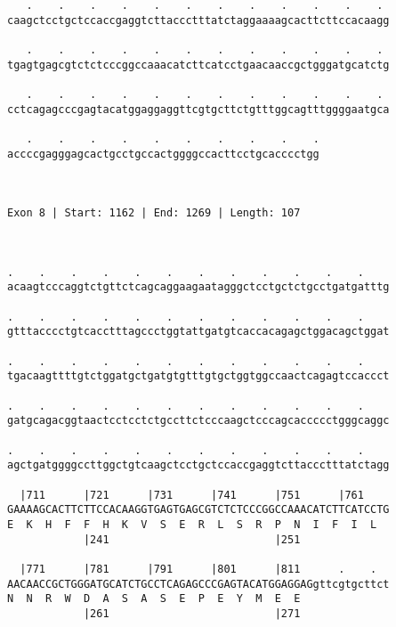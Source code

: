 \documentclass{article}
\begin{document}
\begin{Verbatim}
   .    .    .    .    .    .    .    .    .    .    .    . 
caagctcctgctccaccgaggtcttaccctttatctaggaaaagcacttcttccacaagg
                                                            
   .    .    .    .    .    .    .    .    .    .    .    . 
tgagtgagcgtctctcccggccaaacatcttcatcctgaacaaccgctgggatgcatctg
                                                            
   .    .    .    .    .    .    .    .    .    .    .    . 
cctcagagcccgagtacatggaggaggttcgtgcttctgtttggcagtttggggaatgca
                                                            
   .    .    .    .    .    .    .    .    .    .
accccgagggagcactgcctgccactggggccacttcctgcacccctgg
                                                 
                                                 
 
Exon 8 | Start: 1162 | End: 1269 | Length: 107



.    .    .    .    .    .    .    .    .    .    .    .    
acaagtcccaggtctgttctcagcaggaagaatagggctcctgctctgcctgatgatttg
                                                            
.    .    .    .    .    .    .    .    .    .    .    .    
gtttacccctgtcacctttagccctggtattgatgtcaccacagagctggacagctggat
                                                            
.    .    .    .    .    .    .    .    .    .    .    .    
tgacaagttttgtctggatgctgatgtgtttgtgctggtggccaactcagagtccaccct
                                                            
.    .    .    .    .    .    .    .    .    .    .    .    
gatgcagacggtaactcctcctctgccttctcccaagctcccagcaccccctgggcaggc
                                                            
.    .    .    .    .    .    .    .    .    .    .    .    
agctgatggggccttggctgtcaagctcctgctccaccgaggtcttaccctttatctagg
                                                            
  |711      |721      |731      |741      |751      |761    
GAAAAGCACTTCTTCCACAAGGTGAGTGAGCGTCTCTCCCGGCCAAACATCTTCATCCTG
E  K  H  F  F  H  K  V  S  E  R  L  S  R  P  N  I  F  I  L  
            |241                          |251              
  
  |771      |781      |791      |801      |811      .    .  
AACAACCGCTGGGATGCATCTGCCTCAGAGCCCGAGTACATGGAGGAGgttcgtgcttct
N  N  R  W  D  A  S  A  S  E  P  E  Y  M  E  E              
            |261                          |271              
  

\end{Verbatim}
\end{document}
